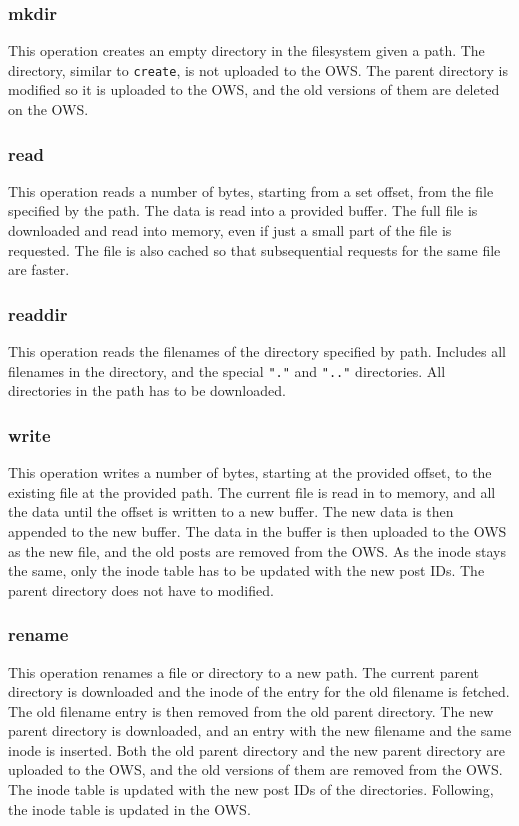 \subsubsection{mkdir}
This operation creates an empty directory in the filesystem given a path. The directory, similar to \texttt{create}, is not uploaded to the OWS. The parent directory is modified so it is uploaded to the OWS, and the old versions of them are deleted on the OWS.

\subsubsection{read}
This operation reads a number of bytes, starting from a set offset, from the file specified by the path. The data is read into a provided buffer. The full file is downloaded and read into memory, even if just a small part of the file is requested. The file is also cached so that subsequential requests for the same file are faster. 

\subsubsection{readdir}
This operation reads the filenames of the directory specified by path. Includes all filenames in the directory, and the special \texttt{"."} and \texttt{".."} directories. All directories in the path has to be downloaded.

\subsubsection{write}
This operation writes a number of bytes, starting at the provided offset, to the existing file at the provided path. The current file is read in to memory, and all the data until the offset is written to a new buffer. The new data is then appended to the new buffer. The data in the buffer is then uploaded to the OWS as the new file, and the old posts are removed from the OWS. As the inode stays the same, only the inode table has to be updated with the new post IDs. The parent directory does not have to modified. 

\subsubsection{rename}
This operation renames a file or directory to a new path. The current parent directory is downloaded and the inode of the entry for the old filename is fetched. The old filename entry is then removed from the old parent directory. The new parent directory is downloaded, and an entry with the new filename and the same inode is inserted. Both the old parent directory and the new parent directory are uploaded to the OWS, and the old versions of them are removed from the OWS. The inode table is updated with the new post IDs of the directories. Following, the inode table is updated in the OWS.

